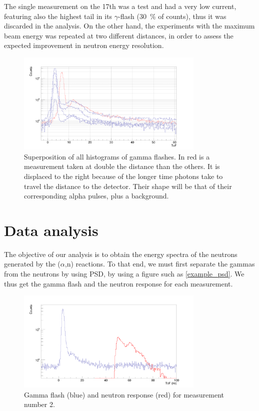 \documentclass[a4paper,12pt]{report}
\newcommand{\an}{($\alpha$,n) }
\begin{document}
The single measurement on the 17th was a test and had a very low current, featuring also the highest tail in its $\gamma$-flash (\qty{30}{\percent} of counts), thus it was discarded in the analysis.
On the other hand, the experiments with the maximum beam energy was repeated at two different distances, in order to assess the expected improvement in neutron energy resolution.

\begin{figure}[H]
	\centering
	\includegraphics[width=0.80\textwidth]{uneven_gflash.png}
	\caption{Superposition of all histograms of gamma flashes.
	In red is a measurement taken at double the distance than the others.
	It is displaced to the right because of the longer time photons take to travel the distance to the detector.
	Their shape will be that of their corresponding alpha pulses, plus a background.}
	\label{uneven_gflash}
\end{figure}

\section{Data analysis}
The objective of our analysis is to obtain the energy spectra of the neutrons generated by the \an reactions.
To that end, we must first separate the gammas from the neutrons by using PSD, by using a figure such as \ref{example_psd}.
We thus get the gamma flash and the neutron response for each measurement.

\begin{figure}[H]
	\centering
	\includegraphics[width=0.80\textwidth]{separated_tof.png}
	\caption{Gamma flash (blue) and neutron response (red) for measurement number 2.}
	\label{separated_tof}
\end{figure}
\end{document}
